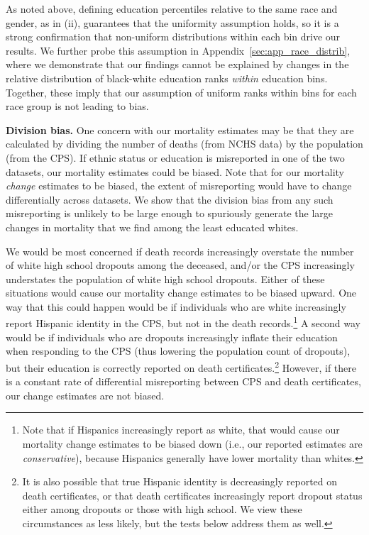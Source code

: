 \documentclass[12pt,letterpaper]{article}
\numberwithin{equation}{section}
\begin{document}
As noted above, defining education percentiles relative to the same race and
gender, as in (ii), guarantees that the uniformity assumption holds, so it is a
strong confirmation that non-uniform distributions within each bin
drive our results. We further probe this assumption in
Appendix~\ref{sec:app_race_distrib}, where we demonstrate that our
findings cannot be explained by changes in the relative distribution
of black-white education ranks \textit{within} education
bins. Together, these imply that our assumption of uniform ranks within bins for each race group is not leading to bias.

\textbf{Division bias.} One concern with our mortality estimates may
be that they are calculated by dividing the number of deaths (from
NCHS data) by the population (from the CPS). If ethnic status or
education is misreported in one of the two datasets, our mortality
estimates could be biased. Note that for our mortality \textit{change}
estimates to be biased, the extent of misreporting would have to
change differentially across datasets. We show that the division bias from any such misreporting is unlikely to be large enough to spuriously generate the large changes in mortality that we find among the least educated whites.

We would be most concerned if death records increasingly overstate the number of white high school dropouts among the deceased, and/or the CPS increasingly understates the population of white high school dropouts. Either of these situations would cause our mortality change estimates to be biased upward. One way that this could happen would be if individuals who are white increasingly report Hispanic identity in the CPS, but not in the death records.\footnote{Note that if Hispanics increasingly report as white, that would cause our mortality change estimates to be biased down (i.e., our reported estimates are \textit{conservative}), because Hispanics generally have lower mortality than whites.} A second way would be if individuals who are dropouts increasingly inflate their education when responding to the CPS (thus lowering the population count of dropouts), but their education is correctly reported on death certificates.\footnote{It is also possible that true Hispanic identity is decreasingly reported on death certificates, or that death certificates increasingly report dropout status either among dropouts or those with high school. We view these circumstances as less likely, but the tests below address them as well.} However, if there is a constant rate of differential misreporting between CPS and death certificates, our change estimates are not biased.
\end{document}
